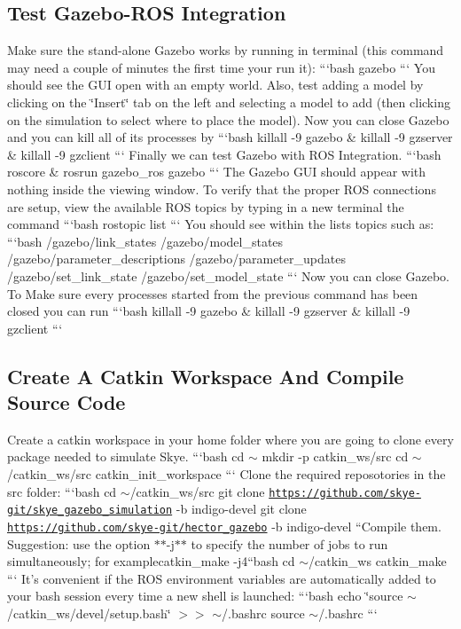 {\ttfamily \subsection*{Test Gazebo-\/\-R\-O\-S Integration}}

{\ttfamily  Make sure the stand-\/alone Gazebo works by running in terminal (this command may need a couple of minutes the first time your run it)\-: ```bash gazebo ``` You should see the G\-U\-I open with an empty world. Also, test adding a model by clicking on the \char`\"{}\-Insert\char`\"{} tab on the left and selecting a model to add (then clicking on the simulation to select where to place the model). Now you can close Gazebo and you can kill all of its processes by ```bash killall -\/9 gazebo \& killall -\/9 gzserver \& killall -\/9 gzclient ``` Finally we can test Gazebo with R\-O\-S Integration. ```bash roscore \& rosrun gazebo\-\_\-ros gazebo ``` The Gazebo G\-U\-I should appear with nothing inside the viewing window. To verify that the proper R\-O\-S connections are setup, view the available R\-O\-S topics by typing in a new terminal the command ```bash rostopic list ``` You should see within the lists topics such as\-: ```bash /gazebo/link\-\_\-states /gazebo/model\-\_\-states /gazebo/parameter\-\_\-descriptions /gazebo/parameter\-\_\-updates /gazebo/set\-\_\-link\-\_\-state /gazebo/set\-\_\-model\-\_\-state ``` Now you can close Gazebo. To Make sure every processes started from the previous command has been closed you can run ```bash killall -\/9 gazebo \& killall -\/9 gzserver \& killall -\/9 gzclient ```}

{\ttfamily \subsection*{Create A Catkin Workspace And Compile Source Code}}

{\ttfamily  Create a catkin workspace in your home folder where you are going to clone every package needed to simulate Skye. ```bash cd $\sim$ mkdir -\/p catkin\-\_\-ws/src cd $\sim$/catkin\-\_\-ws/src catkin\-\_\-init\-\_\-workspace ``` Clone the required reposotories in the src folder\-: ```bash cd $\sim$/catkin\-\_\-ws/src git clone \href{https://github.com/skye-git/skye_gazebo_simulation}{\tt https\-://github.\-com/skye-\/git/skye\-\_\-gazebo\-\_\-simulation} -\/b indigo-\/devel git clone \href{https://github.com/skye-git/hector_gazebo}{\tt https\-://github.\-com/skye-\/git/hector\-\_\-gazebo} -\/b indigo-\/devel ``{\ttfamily  Compile them. Suggestion\-: use the option $\ast$$\ast$-\/j$\ast$$\ast$ to specify the number of jobs to run simultaneously; for example}catkin\-\_\-make -\/j4{\ttfamily  }``bash cd $\sim$/catkin\-\_\-ws catkin\-\_\-make ``` It's convenient if the R\-O\-S environment variables are automatically added to your bash session every time a new shell is launched\-: ```bash echo \char`\"{}source $\sim$/catkin\-\_\-ws/devel/setup.\-bash\char`\"{} $>$$>$ $\sim$/.bashrc source $\sim$/.bashrc ```}


